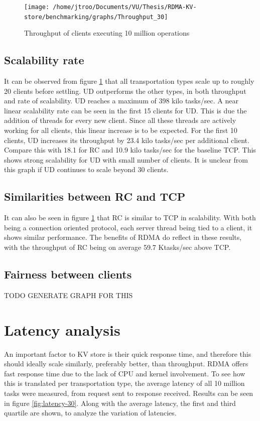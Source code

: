 \begin{figure}
    \centering
    \texttt{[image: /home/jtroo/Documents/VU/Thesis/RDMA-KV-store/benchmarking/graphs/Throughput\_30]}
    \caption{Throughput of clients executing 10 million operations}
    \label{fig:throughput-30}
\end{figure}

\subsection{Scalability rate}
It can be observed from figure \ref{fig:throughput-30} that all transportation types scale up to roughly 20 clients before settling.
UD outperforms the other types, in both throughput and rate of scalability.
UD reaches a maximum of 398 kilo tasks/sec.
A near linear scalability rate can be seen in the first 15 clients for UD.
This is due the addition of threads for every new client.
Since all these threads are actively working for all clients, this linear increase is to be expected.
For the first 10 clients, UD increases its throughput by 23.4 kilo tasks/sec per additional client.
Compare this with 18.1 for RC and 10.9 kilo tasks/sec for the baseline TCP.
This shows strong scalability for UD with small number of clients.
It is unclear from this graph if UD continues to scale beyond 30 clients.

\subsection{Similarities between RC and TCP}
It can also be seen in figure \ref{fig:throughput-30} that RC is similar to TCP in scalability.
With both being a connection oriented protocol, each server thread being tied to a client, it shows similar performance.
The benefits of RDMA do reflect in these results, with the throughput of RC being on average 59.7 Ktasks/sec above TCP.

\subsection{Fairness between clients}
TODO GENERATE GRAPH FOR THIS

\section{Latency analysis}\label{sec:latency:analysis}
An important factor to KV store is their quick response time, and therefore this should ideally scale similarly, preferably better, than throughput.
RDMA offers fast response time due to the lack of CPU and kernel involvement.
To see how this is translated per transportation type, the average latency of all 10 million tasks were measured, from request sent to response received.
Results can be seen in figure \ref{fig:latency-30}.
Along with the average latency, the first and third quartile are shown, to analyze the variation of latencies.


